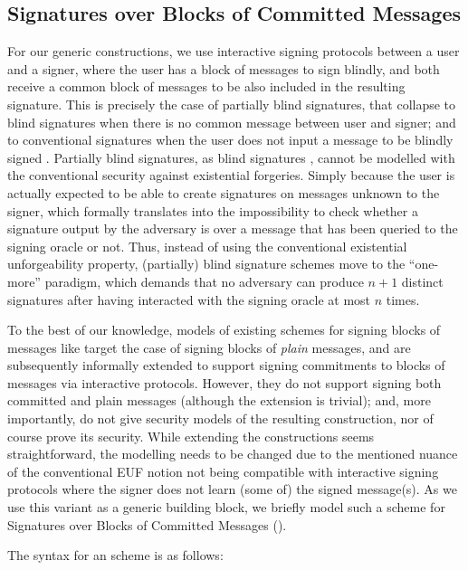 \subsection{Signatures over Blocks of Committed Messages}
\label{sapp:sbcm}

For our generic constructions, we use interactive signing protocols between a
user and a signer, where the user has a block of messages to sign blindly, and
both receive a common block of messages to be also included in the resulting
signature. This is precisely the case of partially blind signatures, that
collapse to blind signatures when there is no common message between user
and signer; and to conventional signatures when the user does not input a
message to be blindly signed \cite{ao00}. Partially blind signatures, as
blind signatures \cite{ps96}, cannot be modelled with the conventional security
against existential forgeries. Simply because the user is actually expected to
be able to create signatures on messages unknown to the signer, which formally
translates into the impossibility to check whether a signature output by the
adversary is over a message that has been queried to the signing oracle or not.
Thus, instead of using the conventional existential unforgeability property,
(partially) blind signature schemes move to the ``one-more'' paradigm, which
demands that no adversary can produce $n+1$ distinct signatures after having
interacted with the signing oracle at most $n$ times.

To the best of our knowledge, models of existing schemes for signing blocks of
messages like \cite{cl02,asm06,ps16,cdl16b} target the case of signing blocks
of \emph{plain} messages, and are subsequently informally extended to support
signing commitments to blocks of messages via interactive protocols. However,
they do not support signing both committed and plain messages (although the
extension is trivial); and, more importantly, do not give security models of
the resulting construction, nor of course prove its security. While extending
the constructions seems straightforward, the modelling needs to be changed due
to the mentioned nuance of the conventional EUF notion not being compatible with
interactive signing protocols where the signer does not learn (some of) the
signed message(s). As we use this variant as a generic building block,
we briefly model such a scheme for Signatures over Blocks of Committed Messages
(\SBCM).

The syntax for an \SBCM scheme is as follows:

